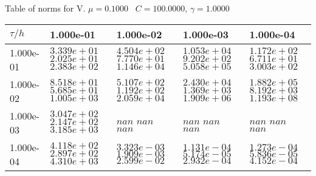 \begin{center}
Table of norms for V. $\mu = 0.1000$ \, $C = 100.0000$, $\gamma = 1.0000$
  
\begin{tabular}{|p{1in}|p{1in}|p{1in}|p{1in}|p{1in}|} \hline
$\tau / h$ &1.000e-01 &1.000e-02 &1.000e-03 &1.000e-04 \\ \hline 
1.000e-01 & $3.339e+01$  $2.025e+01$  $2.383e+02$  & $4.504e+02$  $7.770e+01$  $1.146e+04$  & $1.053e+04$  $9.202e+02$  $5.058e+05$  & $1.172e+02$  $6.711e+01$  $3.003e+02$  \\ \hline 
1.000e-02 & $8.518e+01$  $5.685e+01$  $1.005e+03$  & $5.107e+02$  $1.192e+02$  $2.059e+04$  & $2.430e+04$  $1.369e+03$  $1.909e+06$  & $1.882e+05$  $8.192e+03$  $1.193e+08$  \\ \hline 
1.000e-03 & $3.047e+02$  $2.147e+02$  $3.185e+03$  & $nan$  $nan$  $nan$  & $nan$  $nan$  $nan$  & $nan$  $nan$  $nan$  \\ \hline 
1.000e-04 & $4.118e+02$  $2.897e+02$  $4.310e+03$  & $3.323e-03$  $1.909e-03$  $2.599e-02$  & $1.131e-04$  $5.174e-05$  $2.932e-04$  & $1.273e-04$  $5.836e-05$  $4.152e-04$  \\ \hline 

\end{tabular}\\[20pt]
\end{center}
